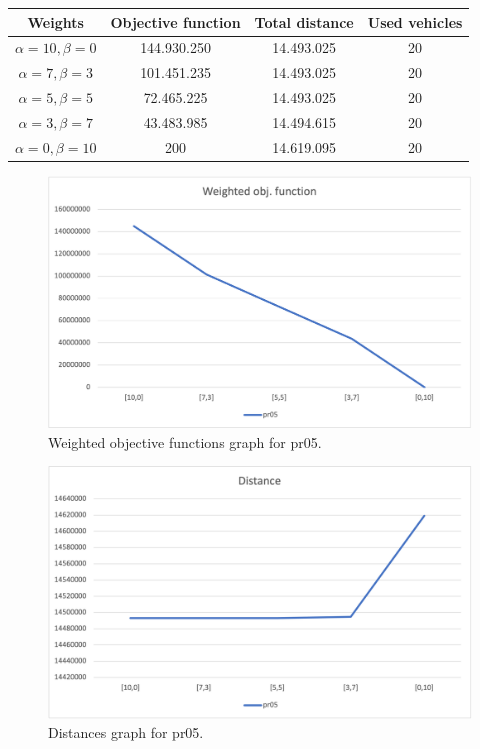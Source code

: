 {
\renewcommand{\arraystretch}{2}
\begin{longtable}[h]{| c | c | c | c |}
    \hline
    \textbf{Weights} & \textbf{Objective function} & \textbf{Total distance} & \textbf{Used vehicles} \\
    \hline
    \endhead
    $\alpha = 10, \beta = 0$ & 144.930.250 & 14.493.025 & 20 \\
    \hline
    $\alpha = 7, \beta = 3$  & 101.451.235 & 14.493.025 & 20 \\
    \hline
    $\alpha = 5, \beta = 5$  &  72.465.225 & 14.493.025 & 20 \\
    \hline
    $\alpha = 3, \beta = 7$  &  43.483.985 & 14.494.615 & 20 \\
    \hline
    $\alpha = 0, \beta = 10$ &         200 & 14.619.095 & 20 \\
    \hline
\end{longtable}
}
\begin{figure}[H]
    \centering
    \includegraphics[width=1.0\columnwidth]{../graphs/pr05-wobjf.png}
    \caption{Weighted objective functions graph for pr05.}
\end{figure}

\begin{figure}[H]
    \centering
    \includegraphics[width=1.0\columnwidth]{../graphs/pr05-distance.png}
    \caption{Distances graph for pr05.}
\end{figure}

